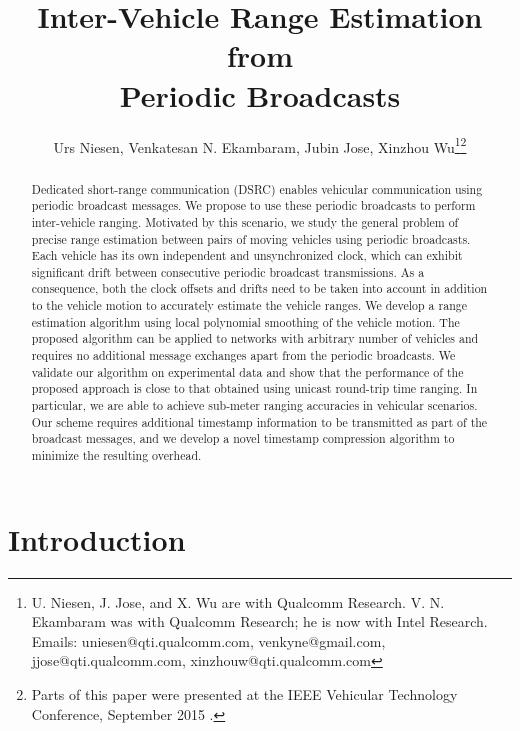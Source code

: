 \documentclass[12pt,journal,final,onecolumn]{IEEEtran}
\theoremstyle{definition}
\theoremstyle{myremark}
\begin{document}
\title{Inter-Vehicle Range Estimation from \\ Periodic Broadcasts}

\author{Urs Niesen, Venkatesan N. Ekambaram, Jubin Jose, Xinzhou Wu\thanks{U. Niesen, J. Jose, and X. Wu are with Qualcomm Research. V. N.
    Ekambaram was with Qualcomm Research; he is now with Intel Research.
    Emails: uniesen@qti.qualcomm.com, venkyne@gmail.com, jjose@qti.qualcomm.com, 
    xinzhouw@qti.qualcomm.com}\thanks{Parts of this paper were presented at the IEEE
        Vehicular Technology Conference, September 2015 \cite{niesen2015}.}}

\maketitle

\begin{abstract}
    Dedicated short-range communication (DSRC) enables vehicular communication
    using periodic broadcast messages. We propose to use these periodic
    broadcasts to perform inter-vehicle ranging. Motivated by this scenario, we
    study the general problem of precise range estimation between pairs of
    moving vehicles using periodic broadcasts. Each vehicle has its own
    independent and unsynchronized clock, which can exhibit significant drift
    between consecutive periodic broadcast transmissions. As a consequence, both
    the clock offsets and drifts need to be taken into account in addition to
    the vehicle motion to accurately estimate the vehicle ranges. We develop a
    range estimation algorithm using local polynomial smoothing of the vehicle
    motion. The proposed algorithm can be applied to networks with arbitrary
    number of vehicles and requires no additional message exchanges apart from
    the periodic broadcasts. We validate our algorithm on experimental data and
    show that the performance of the proposed approach is close to that obtained
    using unicast round-trip time ranging. In particular, we are able to achieve
    sub-meter ranging accuracies in vehicular scenarios. Our scheme requires
    additional timestamp information to be transmitted as part of the broadcast
    messages, and we develop a novel timestamp compression algorithm to minimize
    the resulting overhead.
\end{abstract}


\section{Introduction}
\label{sec:intro}
\end{document}
